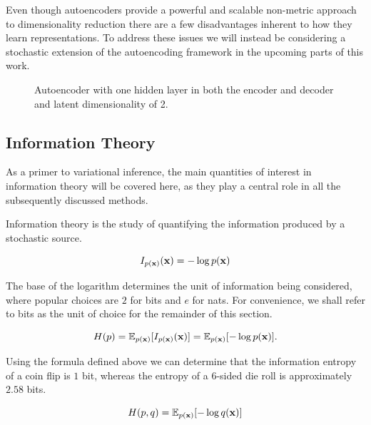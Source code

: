 Even though autoencoders provide a powerful and scalable non-metric approach to dimensionality reduction there are a few disadvantages inherent to how they learn representations.  To address these issues we will instead be considering a stochastic extension of the autoencoding framework in the upcoming parts of this work.

\begin{figure}[!htb]
  \centering
  \resizebox{0.8\textwidth}{!}{\unskip}
  \caption{Autoencoder with one hidden layer in both the encoder and decoder and latent dimensionality of 2.}
  \label{fig:ae}
\end{figure}

\subsection{Information Theory}

As a primer to variational inference, the main quantities of interest in information theory will be covered here, as they play a central role in all the subsequently discussed methods.

Information theory is the study of quantifying the information produced by a stochastic source.


$$I_{p(\mathbf{x})}(\mathbf{x}) = -\log p(\mathbf{x})$$

The base of the logarithm determines the unit of information being considered, where popular choices are $2$ for bits and $e$ for nats. For convenience, we shall refer to bits as the unit of choice for the remainder of this section.


$$H(p) = \mathbb{E}_{p(\mathbf{x})}[I_{p(\mathbf{x})}(\mathbf{x})] = \mathbb{E}_{p(\mathbf{x})}[-\log p(\mathbf{x})].$$

Using the formula defined above we can determine that the information entropy of a coin flip is $1$ bit, whereas the entropy of a 6-sided die roll is approximately $2.58$ bits.


$$H(p,q) = \mathbb{E}_{p(\mathbf{x})}[-\log q(\mathbf{x})]$$

